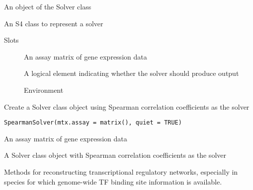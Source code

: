 \documentclass[a4paper]{book}
\begin{document}
%
\begin{Value}
An object of the Solver class
\end{Value}
%
\begin{Description}\relax
An S4 class to represent a solver
\end{Description}
%
\begin{Section}{Slots}

\begin{description}

\item[] An assay matrix of gene expression data

\item[] A logical element indicating whether the solver should produce output

\item[] Environment

\end{description}
\end{Section}
%
\begin{Description}\relax
Create a Solver class object using Spearman correlation coefficients as the solver
\end{Description}
%
\begin{Usage}
\begin{verbatim}
SpearmanSolver(mtx.assay = matrix(), quiet = TRUE)
\end{verbatim}
\end{Usage}
%
\begin{Arguments}
\begin{ldescription}
\item[\code{mtx.assay}] An assay matrix of gene expression data
\end{ldescription}
\end{Arguments}
%
\begin{Value}
A Solver class object with Spearman correlation coefficients as the solver
\end{Value}
%
\begin{Description}\relax
Methods for reconstructing transcriptional regulatory networks, especially in species
for which genome-wide TF binding site information is available.

\end{Description}
\end{document}
